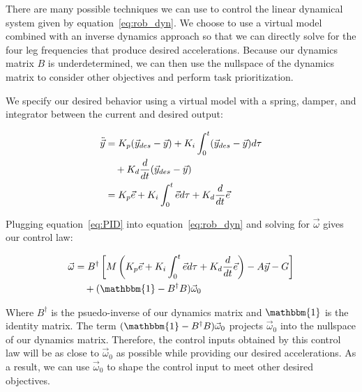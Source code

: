 There are many possible techniques we can use to control the linear dynamical system given by equation~\ref{eq:rob_dyn}. We choose to use a virtual model combined with an inverse dynamics approach so that we can directly solve for the four leg frequencies that produce desired accelerations. Because our dynamics matrix $B$ is underdetermined, we can then use the nullspace of the dynamics matrix to consider other objectives and perform task prioritization.

We specify our desired behavior using a virtual model with a spring, damper, and integrator between the current and desired output:

\begin{align}
    \ddot{\vec{y}} &= K_p (\vec{y}_{des} - \vec{y}) + K_i \int_0^t (\vec{y}_{des} - \vec{y}) d\tau \notag \\
                         &\quad + K_d \frac{d}{dt} (\vec{y}_{des} - \vec{y}) \notag \\
                         &= K_p \vec{e} + K_i \int_0^t \vec{e} d \tau + K_d \frac{d}{dt} \vec{e} \label{eq:PID}
\end{align}

Plugging equation~\ref{eq:PID} into equation~\ref{eq:rob_dyn} and solving for $\vec{\omega}$ gives our control law:

\begin{align}
    \vec{\omega} &= B^{\dagger} \left[ M \left(K_p \vec{e} + K_i \int_0^t \vec{e} d \tau + K_d \frac{d}{dt} \vec{e} \right)- A \vec{y} - G \right] \notag \\
                 &\quad + (\mathbbm{1} - B^{\dagger} B) \vec{\omega}_0 \label{eq:control}
\end{align}

\noindent Where $B^{\dagger}$ is the psuedo-inverse of our dynamics matrix and $\mathbbm{1}$ is the identity matrix. The term $(\mathbbm{1} - B^{\dagger} B) \vec{\omega}_0$ projects $\vec{\omega}_0$ into the nullspace of our dynamics matrix. Therefore, the control inputs obtained by this control law will be as close to $\vec{\omega}_0$ as possible while providing our desired accelerations. As a result, we can use $\vec{\omega}_0$ to shape the control input to meet other desired objectives.

